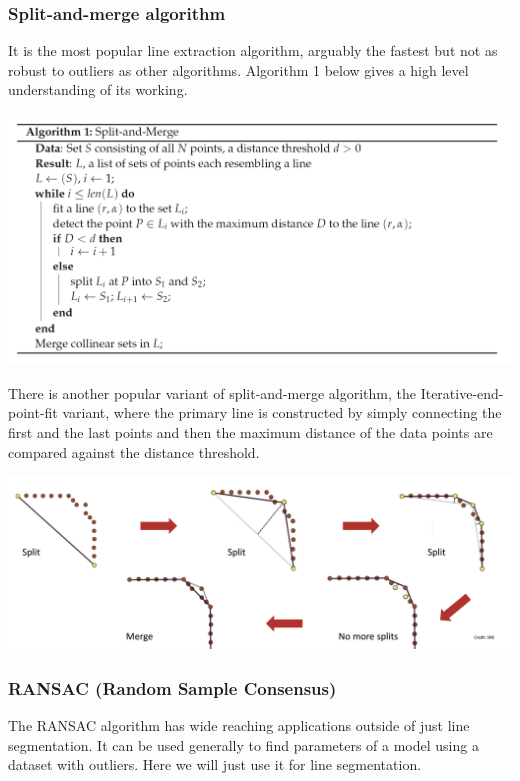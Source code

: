\documentclass[twoside]{article}
\begin{document}
\subsubsection{Split-and-merge algorithm}
It is the most popular line extraction algorithm, arguably the fastest but not as robust to outliers as other algorithms. Algorithm 1 below gives a high level understanding of its working.

\begin{center}
	\includegraphics[width=1\textwidth]{splitandmerge}
\end{center}

There is another popular variant of split-and-merge algorithm, the Iterative-end-point-fit variant, where the primary line is constructed by simply connecting the first and the last points and then the maximum distance of the data points are compared against the distance threshold.

\begin{center}
	\includegraphics[width=1\textwidth]{iterativesplit}
\end{center}

\subsubsection{RANSAC (Random Sample Consensus)}
The RANSAC algorithm has wide reaching applications outside of just line segmentation. It can be used generally to find parameters of a model using a dataset with outliers. Here we will just use it for line segmentation.
\end{document}
